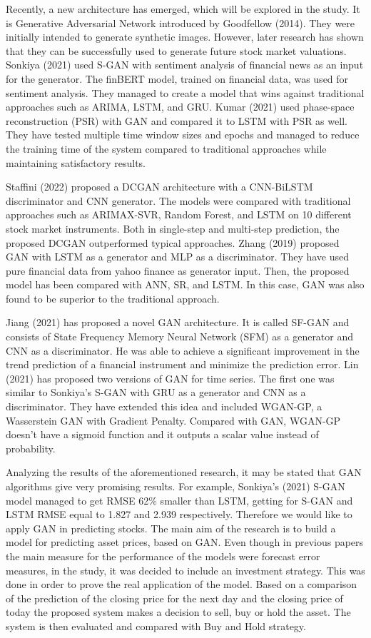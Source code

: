\documentclass[11pt]{article} %
\begin{document}
Recently, a new architecture has emerged, which will be explored in the study. It is Generative Adversarial Network introduced by Goodfellow (2014). They were initially intended to generate synthetic images. However, later research has shown that they can be successfully used to generate future stock market valuations. Sonkiya (2021) used S-GAN with sentiment analysis of financial news as an input for the generator. The finBERT model, trained on financial data, was used for sentiment analysis. They managed to create a model that wins against traditional approaches such as ARIMA, LSTM, and GRU. Kumar (2021) used phase-space reconstruction (PSR) with GAN and compared it to LSTM with PSR as well. They have tested multiple time window sizes and epochs and managed to reduce the training time of the system compared to traditional approaches while maintaining satisfactory results. 

Staffini (2022) proposed a DCGAN architecture with a CNN-BiLSTM discriminator and CNN generator. The models were compared with traditional approaches such as ARIMAX-SVR, Random Forest, and LSTM on 10 different stock market instruments. Both in single-step and multi-step prediction, the proposed DCGAN outperformed typical approaches. Zhang (2019) proposed GAN with LSTM as a generator and MLP as a discriminator. They have used pure financial data from yahoo finance as generator input. Then, the proposed model has been compared with ANN, SR, and LSTM. In this case, GAN was also found to be superior to the traditional approach.  

Jiang (2021) has proposed a novel GAN architecture. It is called SF-GAN and consists of 
State Frequency Memory Neural Network (SFM) as a generator and CNN as a discriminator. 
He was able to achieve a significant improvement in the trend prediction of a financial instrument and minimize the prediction error.  Lin (2021) has proposed two versions of GAN for time series. The first one was similar to Sonkiya's S-GAN with GRU as a generator and CNN as a discriminator. They have extended this idea and included WGAN-GP, a Wasserstein GAN with Gradient Penalty. Compared with GAN, WGAN-GP doesn't have a sigmoid function and it outputs a scalar value instead of probability. 

Analyzing the results of the aforementioned research, it may be stated that GAN algorithms give very promising results. For example, Sonkiya's (2021) S-GAN model managed to get RMSE 62$\% $ smaller than LSTM, getting for S-GAN and LSTM RMSE equal to 1.827 and 2.939 respectively. Therefore we would like to apply GAN in predicting stocks. The main aim of the research is to build a model for predicting asset prices, based on GAN. Even though in previous papers the main measure for the performance of the models were forecast error measures, in the study, it was decided to include an investment strategy. This was done in order to prove the real application of the model. Based on a comparison of the prediction of the closing price for the next day and the closing price of today the proposed system makes a decision to sell, buy or hold the asset. The system is then evaluated and compared with Buy and Hold strategy.
\end{document}
